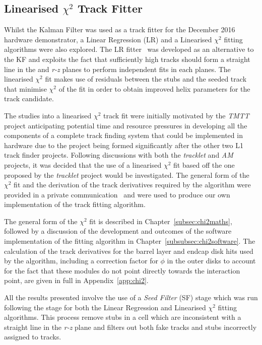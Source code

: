 \subsection{Linearised $\chi^{2}$ Track Fitter}\label{subsec:chi2}
Whilst the Kalman Filter was used as a track fitter for the December 2016 hardware demonstrator, a Linear Regression (LR) and a Linearised $\chi^{2}$ fitting algorithms were also explored.
The LR fitter~\cite{TMTT_FLP} was developed as an alternative to the KF and exploits the fact that sufficiently high \pT tracks should form a straight line in the \emph{\rphi} and \emph{r-z} planes to perform independent fits in each planes.
The linearised $\chi^{2}$ fit makes use of residuals between the stubs and the seeded track that minimise $\chi^{2}$ of the fit in order to obtain improved helix parameters for the track candidate.

The studies into a linearised $\chi^{2}$ track fit were initially motivated by the \emph{TMTT} project anticipating potential time and resource pressures in developing all the components of a complete track finding system that could be implemented in hardware due to the project being formed significantly after the other two L1 track finder projects.
Following discussions with both the \emph{tracklet} and \emph{AM} projects, it was decided that the use of a linearised $\chi^{2}$ fit based off the one proposed by the \emph{tracklet} project would be investigated.
The general form of the $\chi^{2}$ fit and the derivation of the track derivatives required by the algorithm were provided in a private communication~\cite{CMS_DN-14-043} and were used to produce our own implementation of the track fitting algorithm.

The general form of the $\chi^{2}$ fit is described in Chapter~\ref{subsec:chi2maths}, followed by a discussion of the development and outcomes of the software implementation of the fitting algorithm in Chapter~\ref{subsubsec:chi2software}.
The calculation of the track derivatives for the barrel layer and endcap disk hits used by the algorithm, including a correction factor for $\phi$ in the outer disks to account for the fact that these modules do not point directly towards the interaction point, are given in full in Appendix~\ref{app:chi2}.

All the results presented involve the use of a \emph{Seed Filter} (SF) stage which was run following the \HT stage for both the Linear Regression and Linearised $\chi^{2}$ fitting algorithms.
This process remove stubs in a \HT cell which are inconsistent with a straight line in the \emph{r-z} plane and filters out both fake tracks and stubs incorrectly assigned to tracks.

